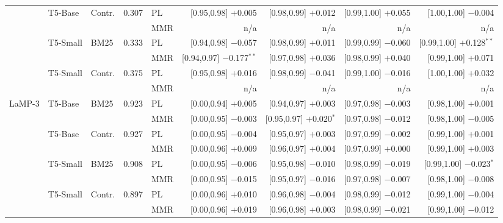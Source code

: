 \documentclass[10pt,twocolumn]{article}
\begin{document}
\begin{table}[t]
\begin{tabular}{@{}lllrlrrrr@{}}
\cmidrule(lr){1-9}
 & \multirow{2}{*}{T5-Base} & \multirow{2}{*}{Contr.} & \multirow{2}{*}{0.307} & PL & [0.95,0.98] $+$0.005 & [0.98,0.99] $+$0.012 & [0.99,1.00] $+$0.055 & [1.00,1.00] $-$0.004 \\
 & & & & MMR & n/a & n/a & n/a & n/a \\
\cmidrule(lr){1-9}
 & \multirow{2}{*}{T5-Small} & \multirow{2}{*}{BM25} & \multirow{2}{*}{0.333} & PL & [0.94,0.98] $-$0.057 & [0.98,0.99] $+$0.011 & [0.99,0.99] $-$0.060 & [0.99,1.00] $+$0.128$^{**}$ \\
 & & & & MMR & [0.94,0.97] $-$0.177$^{**}$ & [0.97,0.98] $+$0.036 & [0.98,0.99] $+$0.040 & [0.99,1.00] $+$0.071 \\
\cmidrule(lr){1-9}
 & \multirow{2}{*}{T5-Small} & \multirow{2}{*}{Contr.} & \multirow{2}{*}{0.375} & PL & [0.95,0.98] $+$0.016 & [0.98,0.99] $-$0.041 & [0.99,1.00] $-$0.016 & [1.00,1.00] $+$0.032 \\
 & & & & MMR & n/a & n/a & n/a & n/a \\
\midrule
\multirow{2}{*}{LaMP-3} & \multirow{2}{*}{T5-Base} & \multirow{2}{*}{BM25} & \multirow{2}{*}{0.923} & PL & [0.00,0.94] $+$0.005 & [0.94,0.97] $+$0.003 & [0.97,0.98] $-$0.003 & [0.98,1.00] $+$0.001 \\
 & & & & MMR & [0.00,0.95] $-$0.003 & [0.95,0.97] $+$0.020$^{*}$ & [0.97,0.98] $-$0.012 & [0.98,1.00] $-$0.005 \\
\cmidrule(lr){1-9}
 & \multirow{2}{*}{T5-Base} & \multirow{2}{*}{Contr.} & \multirow{2}{*}{0.927} & PL & [0.00,0.95] $-$0.004 & [0.95,0.97] $+$0.003 & [0.97,0.99] $-$0.002 & [0.99,1.00] $+$0.001 \\
 & & & & MMR & [0.00,0.96] $+$0.009 & [0.96,0.97] $+$0.004 & [0.97,0.99] $+$0.000 & [0.99,1.00] $+$0.003 \\
\cmidrule(lr){1-9}
 & \multirow{2}{*}{T5-Small} & \multirow{2}{*}{BM25} & \multirow{2}{*}{0.908} & PL & [0.00,0.95] $-$0.006 & [0.95,0.98] $-$0.010 & [0.98,0.99] $-$0.019 & [0.99,1.00] $-$0.023$^{*}$ \\
 & & & & MMR & [0.00,0.95] $-$0.015 & [0.95,0.97] $-$0.016 & [0.97,0.98] $-$0.007 & [0.98,1.00] $-$0.008 \\
\cmidrule(lr){1-9}
 & \multirow{2}{*}{T5-Small} & \multirow{2}{*}{Contr.} & \multirow{2}{*}{0.897} & PL & [0.00,0.96] $+$0.010 & [0.96,0.98] $-$0.004 & [0.98,0.99] $-$0.012 & [0.99,1.00] $-$0.004 \\
 & & & & MMR & [0.00,0.96] $+$0.019 & [0.96,0.98] $+$0.003 & [0.98,0.99] $-$0.021 & [0.99,1.00] $-$0.012 \\

\end{tabular}
\end{table}
\end{document}
